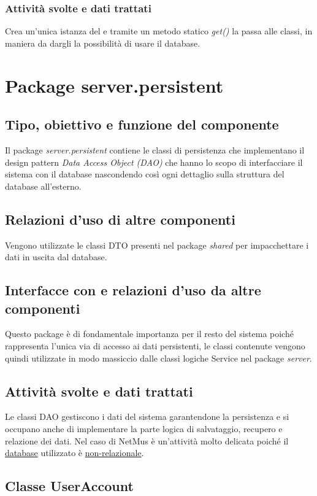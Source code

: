 \subsubsection*{Attivit\`a svolte e dati trattati}
Crea un'unica istanza del  e tramite un metodo
statico \emph{get()} la passa alle classi, in maniera da dargli la possibilit\`a
di usare il database.


\section{Package server.persistent} %
\subsection*{Tipo, obiettivo e funzione del componente}
Il package \emph{server.persistent} contiene le classi di persistenza che
implementano il design pattern \emph{Data Access Object (DAO)} che hanno lo
scopo di interfacciare il sistema con il database nascondendo cos\`i ogni
dettaglio sulla struttura del database all'esterno. 
\subsection*{Relazioni d'uso di altre componenti}
Vengono utilizzate le classi DTO presenti nel package \emph{shared} per
impacchettare i dati in uscita dal database. 
\subsection*{Interfacce con e relazioni d'uso da altre componenti}
Questo package \`e di fondamentale importanza per il resto del sistema poich\'e
rappresenta l'unica via di accesso ai dati persistenti, le classi contenute
vengono quindi utilizzate in modo massiccio dalle classi logiche Service nel
package \emph{server}.
\subsection*{Attivit\`a svolte e dati trattati}
Le classi DAO gestiscono i dati del sistema garantendone la persistenza e si
occupano anche di implementare la parte logica di salvataggio, recupero e
relazione dei dati. Nel caso di NetMus \`e un'attivit\`a molto delicata poich\'e il
\underline{database} utilizzato \`e \underline{non-relazionale}.

\subsection{Classe UserAccount}
